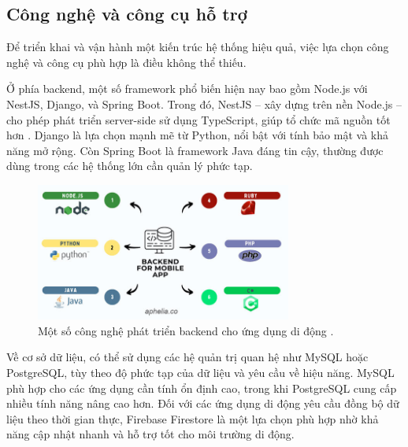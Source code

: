     \subsection{Công nghệ và công cụ hỗ trợ}
    \renewcommand{\labelitemi}{--}
    
        \hspace*{0.8cm}Để triển khai và vận hành một kiến trúc hệ thống hiệu quả, việc lựa chọn công nghệ và công cụ phù hợp là điều không thể thiếu.
      
        \vspace{0.5em}
      
        \hspace*{0.8cm}Ở phía backend, một số framework phổ biến hiện nay bao gồm Node.js với NestJS, Django, và Spring Boot. Trong đó, NestJS – xây dựng trên nền Node.js – cho phép phát triển server-side sử dụng TypeScript, giúp tổ chức mã nguồn tốt hơn \cite{backendframeworks}. Django là lựa chọn mạnh mẽ từ Python, nổi bật với tính bảo mật và khả năng mở rộng. Còn Spring Boot là framework Java đáng tin cậy, thường được dùng trong các hệ thống lớn cần quản lý phức tạp.
      

      \begin{figure}[H]
        \centering
        \includegraphics[width=0.75\textwidth]{images/backend_for_mobile_app.jpg}
        \caption{Một số công nghệ phát triển backend cho ứng dụng di động \cite{aphelia2023}.}
        \label{fig:fig1}
      \end{figure}
        \vspace{0.5em}
      
        \hspace*{0.8cm}Về cơ sở dữ liệu, có thể sử dụng các hệ quản trị quan hệ như MySQL hoặc PostgreSQL, tùy theo độ phức tạp của dữ liệu và yêu cầu về hiệu năng. MySQL phù hợp cho các ứng dụng cần tính ổn định cao, trong khi PostgreSQL cung cấp nhiều tính năng nâng cao hơn. Đối với các ứng dụng di động yêu cầu đồng bộ dữ liệu theo thời gian thực, Firebase Firestore là một lựa chọn phù hợp nhờ khả năng cập nhật nhanh và hỗ trợ tốt cho môi trường di động.
      
